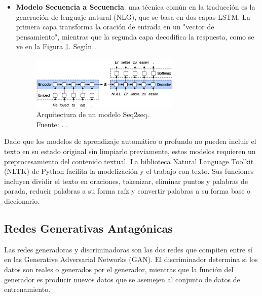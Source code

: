 \begin{itemize}
	\item \textbf{Modelo Secuencia a Secuencia}: una técnica común en la traducción es la generación de lenguaje natural (NLG), que se basa en dos capas LSTM. La primera capa transforma la oración de entrada en un "vector de pensamiento", mientras que la segunda capa decodifica la respuesta, como se ve en la Figura \ref{2:fig46}. Según \parencite{bk_deng2018deeplearningnlp}.
	
	\begin{figure}[!ht]
		\begin{center}
			\includegraphics[width=0.67\textwidth]{2/figures/encoder-decoder.jpg}
			\caption[Arquitectura de un modelo Seq2seq]{Arquitectura de un modelo Seq2seq.\\
			Fuente: \cite{tec_kostadinov2019seq2seq}. .}
			\label{2:fig46}
		\end{center}
	\end{figure}	
\end{itemize}

Dado que los modelos de aprendizaje automático o profundo no pueden incluir el texto en su estado original sin limpiarlo previamente, estos modelos requieren un preprocesamiento del contenido textual. La biblioteca Natural Language Toolkit (NLTK) de Python facilita la modelización y el trabajo con texto. Sus funciones incluyen dividir el texto en oraciones, tokenizar, eliminar puntos y palabras de parada, reducir palabras a su forma raíz y convertir palabras a su forma base o diccionario. \parencite{bk_brownlee2017deeplearning_nlp}

\subsection{Redes Generativas Antagónicas}

Las redes generadoras y discriminadoras son las dos redes que compiten entre sí en las Generative Adversarial Networks (GAN). El discriminador determina si los datos son reales o generados por el generador, mientras que la función del generador es producir nuevos datos que se asemejen al conjunto de datos de entrenamiento. \parencite{tec_goodfellow2014gan}

